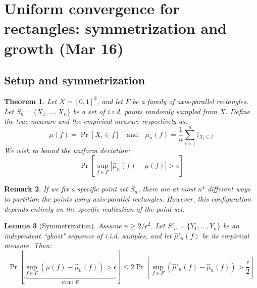 \documentclass[a4paper]{article}
\newtheorem{thm}{Theorem}[section]
\newtheorem{lem}[thm]{Lemma}
\newtheorem{rmk}[thm]{Remark}
\begin{document}
\section{Uniform convergence for rectangles: symmetrization and growth (Mar 16)}

\subsection{Setup and symmetrization}

\begin{thm}
    Let $X = [0,1]^2$, and let $F$ be a family of axis-parallel rectangles. Let $S_n = \{X_1, \dots, X_n\}$ be a set of i.i.d. points randomly sampled from $X$. Define the true measure and the empirical measure respectively as:
    \[
        \mu(f) = \Pr[X_i \in f] \quad \text{and} \quad \hat{\mu}_n(f) = \frac{1}{n}\sum_{i=1}^n \mathbb{I}_{X_i \in f}
    \]
    We wish to bound the uniform deviation:
    \[
        \Pr\left[ \sup_{f \in F} |\hat{\mu}_n(f) - \mu(f)| > \epsilon \right]
    \]
\end{thm}

\begin{rmk}
    If we fix a specific point set $S_n$, there are at most $n^4$ different ways to partition the points using axis-parallel rectangles. However, this configuration depends entirely on the specific realization of the point set.
\end{rmk}

\begin{lem}[Symmetrization]
    Assume $n \geq 2/\epsilon^2$. Let $S'_n = \{Y_1, \dots, Y_n\}$ be an independent ``ghost" sequence of i.i.d. samples, and let $\hat{\mu}'_n(f)$ be its empirical measure. Then:
    \[
        \Pr\left[ \underbrace{\sup_{f \in F} (\mu(f) - \hat{\mu}_n(f)) > \epsilon}_{\text{event } E} \right] \leq 2 \Pr\left[ \sup_{f \in F} (\hat{\mu}'_n(f) - \hat{\mu}_n(f)) > \frac{\epsilon}{2} \right]
    \]
\end{lem}
\end{document}
